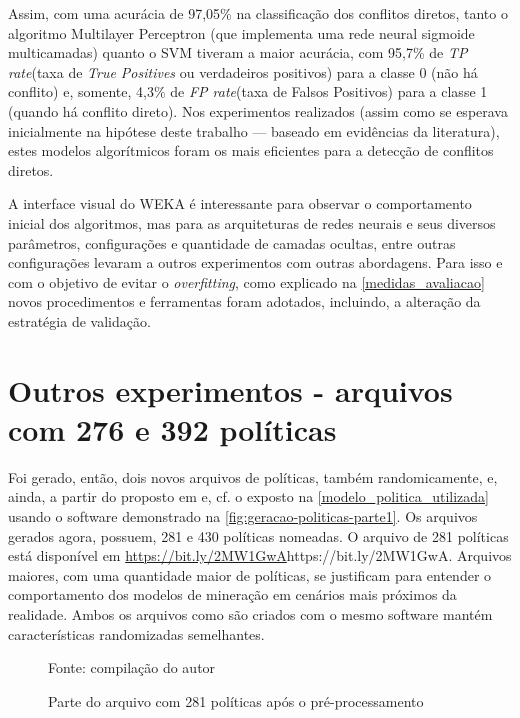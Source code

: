 Assim, com uma acurácia de 97,05\% na classificação dos conflitos diretos, tanto o algoritmo Multilayer Perceptron (que implementa uma rede neural sigmoide multicamadas) quanto o SVM tiveram a maior acurácia, com 95,7\% de \textit{TP rate}(taxa de \textit{True Positives} ou verdadeiros positivos) para a classe 0 (não há conflito) e, somente, 4,3\% de \textit{FP rate}(taxa de Falsos Positivos) para a classe 1 (quando há conflito direto). Nos experimentos realizados (assim como se esperava inicialmente na hipótese deste trabalho --- baseado em evidências da literatura), estes modelos algorítmicos foram os mais eficientes para a detecção de conflitos diretos.

A interface visual do WEKA é interessante para observar o comportamento inicial dos algoritmos, mas para as arquiteturas de redes neurais e seus diversos parâmetros, configurações e quantidade de camadas ocultas, entre outras configurações levaram a outros experimentos com outras abordagens. Para isso e com o objetivo de evitar o \textit{overfitting}, como explicado na \autoref{medidas_avaliacao} novos procedimentos e ferramentas foram adotados, incluindo, a alteração da estratégia de validação.

\section{Outros experimentos - arquivos com 276 e 392 políticas}\label{exp:139-281}
Foi gerado, então, dois novos arquivos de políticas, também randomicamente, e, ainda, a partir do proposto em  e, cf. o exposto na \autoref{modelo_politica_utilizada} usando o software demonstrado na \autoref{fig:geracao-politicas-parte1}. Os arquivos gerados agora, possuem, 281 e 430 políticas nomeadas. O arquivo de 281 políticas está disponível em \url{https://bit.ly/2MW1GwA}{https://bit.ly/2MW1GwA}. Arquivos maiores, com uma quantidade maior de políticas, se justificam para entender o comportamento dos modelos de mineração em cenários mais próximos da realidade. Ambos os arquivos como são criados com o mesmo software mantém características randomizadas semelhantes.

\begin{figure}[h!]
	\centering
	\caption{Parte do arquivo com 281 políticas após o pré-processamento}
	
	\label{fig:dataset-281}
	{\scriptsize Fonte: compilação do autor}
\end{figure}

